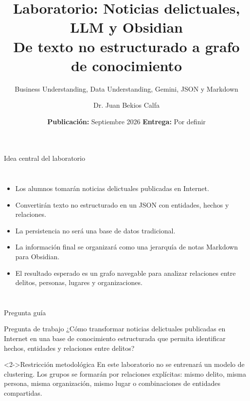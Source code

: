 \documentclass[11pt,aspectratio=169]{beamer}
\title{\Large{Laboratorio: Noticias delictuales, LLM y Obsidian\\ \normalsize De texto no estructurado a grafo de conocimiento}}
\subtitle{Business Understanding, Data Understanding, Gemini, JSON y Markdown}
\author{Dr. Juan Bekios Calfa}
\institute[UCN]{\textbf{Machine Learning / Gestión de Proyectos en IA}\\Universidad Católica del Norte}
\date{\textbf{Publicación:} Septiembre 2026 \hspace{1cm} \textbf{Entrega:} Por definir}
\begin{document}
\begin{frame}
\titlepage
\end{frame}

\begin{frame}{Idea central del laboratorio}
\begin{columns}[T,onlytextwidth]
\footnotesize
\begin{itemize}[<+->]
\item Los alumnos tomarán noticias delictuales publicadas en Internet.
\item Convertirán texto no estructurado en un JSON con entidades, hechos y relaciones.
\item La persistencia no será una base de datos tradicional.
\item La información final se organizará como una jerarquía de notas Markdown para Obsidian.
\item El resultado esperado es un grafo navegable para analizar relaciones entre delitos, personas, lugares y organizaciones.
\end{itemize}
\centering
{}
\end{columns}
\end{frame}

\begin{frame}{Pregunta guía}
\small
\begin{block}{Pregunta de trabajo}
¿Cómo transformar noticias delictuales publicadas en Internet en una base de conocimiento estructurada que permita identificar hechos, entidades y relaciones entre delitos?
\end{block}

\vspace{0.25cm}
\begin{alertblock}<2->{Restricción metodológica}
En este laboratorio no se entrenará un modelo de clustering. Los grupos se formarán por relaciones explícitas: mismo delito, misma persona, misma organización, mismo lugar o combinaciones de entidades compartidas.
\end{alertblock}
\end{frame}
\end{document}
